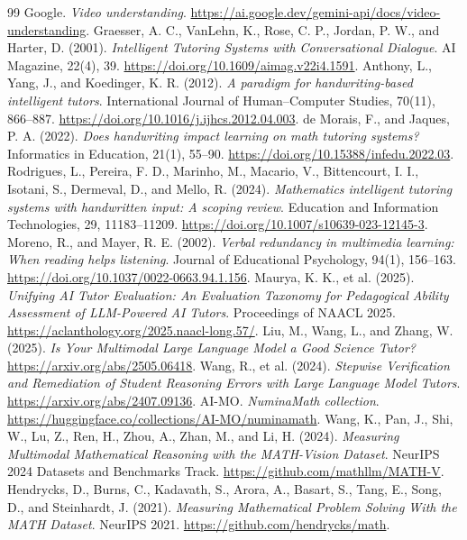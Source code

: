 \documentclass[11pt]{article}
\begin{document}
\begin{thebibliography}{99}
 Google. \emph{Video understanding}. \url{https://ai.google.dev/gemini-api/docs/video-understanding}.
 Graesser, A. C., VanLehn, K., Rose, C. P., Jordan, P. W., and Harter, D. (2001). \emph{Intelligent Tutoring Systems with Conversational Dialogue}. AI Magazine, 22(4), 39. \url{https://doi.org/10.1609/aimag.v22i4.1591}.
 Anthony, L., Yang, J., and Koedinger, K. R. (2012). \emph{A paradigm for handwriting-based intelligent tutors}. International Journal of Human--Computer Studies, 70(11), 866--887. \url{https://doi.org/10.1016/j.ijhcs.2012.04.003}.
 de Morais, F., and Jaques, P. A. (2022). \emph{Does handwriting impact learning on math tutoring systems?} Informatics in Education, 21(1), 55--90. \url{https://doi.org/10.15388/infedu.2022.03}.
 Rodrigues, L., Pereira, F. D., Marinho, M., Macario, V., Bittencourt, I. I., Isotani, S., Dermeval, D., and Mello, R. (2024). \emph{Mathematics intelligent tutoring systems with handwritten input: A scoping review}. Education and Information Technologies, 29, 11183--11209. \url{https://doi.org/10.1007/s10639-023-12145-3}.
 Moreno, R., and Mayer, R. E. (2002). \emph{Verbal redundancy in multimedia learning: When reading helps listening}. Journal of Educational Psychology, 94(1), 156--163. \url{https://doi.org/10.1037/0022-0663.94.1.156}.
 Maurya, K. K., et al. (2025). \emph{Unifying AI Tutor Evaluation: An Evaluation Taxonomy for Pedagogical Ability Assessment of LLM-Powered AI Tutors}. Proceedings of NAACL 2025. \url{https://aclanthology.org/2025.naacl-long.57/}.
 Liu, M., Wang, L., and Zhang, W. (2025). \emph{Is Your Multimodal Large Language Model a Good Science Tutor?} \url{https://arxiv.org/abs/2505.06418}.
 Wang, R., et al. (2024). \emph{Stepwise Verification and Remediation of Student Reasoning Errors with Large Language Model Tutors}. \url{https://arxiv.org/abs/2407.09136}.
 AI-MO. \emph{NuminaMath collection}. \url{https://huggingface.co/collections/AI-MO/numinamath}.
 Wang, K., Pan, J., Shi, W., Lu, Z., Ren, H., Zhou, A., Zhan, M., and Li, H. (2024). \emph{Measuring Multimodal Mathematical Reasoning with the MATH-Vision Dataset}. NeurIPS 2024 Datasets and Benchmarks Track. \url{https://github.com/mathllm/MATH-V}.
 Hendrycks, D., Burns, C., Kadavath, S., Arora, A., Basart, S., Tang, E., Song, D., and Steinhardt, J. (2021). \emph{Measuring Mathematical Problem Solving With the MATH Dataset}. NeurIPS 2021. \url{https://github.com/hendrycks/math}.

\end{thebibliography}
\end{document}
